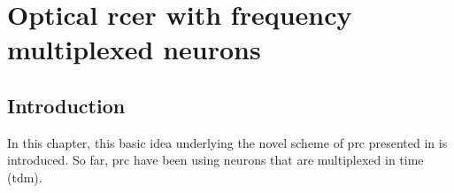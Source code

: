 \chapter{Optical \acrshort{rcer} with frequency multiplexed neurons}

\section{Introduction}

In this chapter, this basic idea underlying the novel scheme of \gls{prc} presented in \cite{AkroutAkram2016Pprc} is introduced. So far, \gls{prc} have been using neurons that are multiplexed in time (\gls{tdm}).